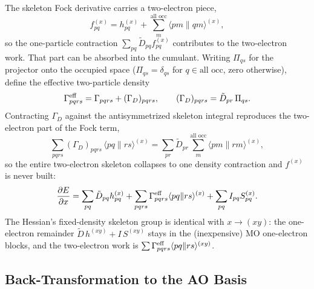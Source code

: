 \documentclass[12pt]{article}
\newcommand{\adb}[2]{\langle #1 \| #2 \rangle}
\newcommand{\alloc}{\text{all occ}}   %
\begin{document}
The skeleton Fock derivative carries a two-electron piece,
\begin{equation}
f^{(x)}_{pq} = h^{(x)}_{pq} + \sum_{m}^{\alloc}\adb{pm}{qm}^{(x)},
\label{eq:fx-twoelec}
\end{equation}
so the one-particle contraction $\sum_{pq}\tilde D_{pq}f^{(x)}_{pq}$ contributes to
the two-electron work.  That part can be absorbed into the cumulant.  Writing
$\Pi_{qs}$ for the projector onto the occupied space ($\Pi_{qs}=\delta_{qs}$ for
$q\in\alloc$, zero otherwise), define the effective two-particle density
\begin{equation}
\Gamma^{\rm eff}_{pqrs} = \Gamma_{pqrs} + (\Gamma_D)_{pqrs},
\qquad
(\Gamma_D)_{pqrs} = \tilde D_{pr}\,\Pi_{qs}.
\label{eq:gam-eff}
\end{equation}
Contracting $\Gamma_D$ against the antisymmetrized skeleton integral reproduces the
two-electron part of the Fock term,
\begin{equation}
\sum_{pqrs}(\Gamma_D)_{pqrs}\,\adb{pq}{rs}^{(x)}
= \sum_{pr}\tilde D_{pr}\sum_{m}^{\alloc}\adb{pm}{rm}^{(x)},
\end{equation}
so the entire two-electron skeleton collapses to one density contraction and
$f^{(x)}$ is never built:
\begin{equation}
\frac{\partial E}{\partial x}
= \sum_{pq}\tilde D_{pq}h^{(x)}_{pq}
+ \sum_{pqrs}\Gamma^{\rm eff}_{pqrs}\adb{pq}{rs}^{(x)}
+ \sum_{pq} I_{pq}S^{(x)}_{pq}.
\label{eq:grad-gameff}
\end{equation}
The Hessian's fixed-density skeleton group is identical with $x\to(xy)$: the
one-electron remainder $\tilde D\,h^{(xy)}+I\,S^{(xy)}$ stays in the (inexpensive) MO
one-electron blocks, and the two-electron work is
$\sum\Gamma^{\rm eff}_{pqrs}\adb{pq}{rs}^{(xy)}$.

\subsection{Back-Transformation to the AO Basis}
\label{sec:ao-backtransform}
\end{document}
